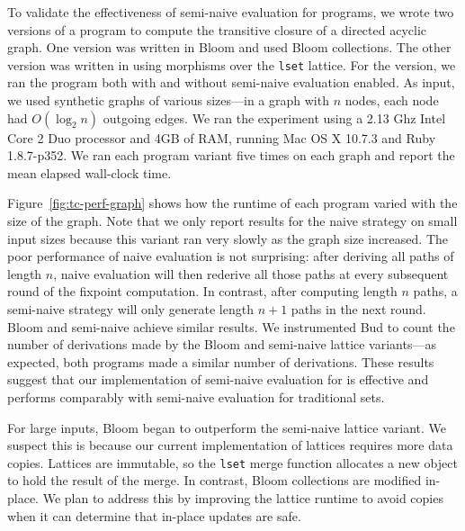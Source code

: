 To validate the effectiveness of semi-naive evaluation for \lang programs, we
wrote two versions of a program to compute the transitive closure of a directed
acyclic graph. One version was written in Bloom and used Bloom collections. The
other version was written in \lang using morphisms over the \texttt{lset}
lattice. For the \lang version, we ran the program both with and without
semi-naive evaluation enabled. As input, we used synthetic graphs of various
sizes---in a graph with $n$ nodes, each node had $O(\log_2 n)$ outgoing
edges. We ran the experiment using a 2.13 Ghz Intel Core 2 Duo processor and 4GB
of RAM, running Mac OS X 10.7.3 and Ruby 1.8.7-p352. We ran each program variant
five times on each graph and report the mean elapsed wall-clock time.

Figure~\ref{fig:tc-perf-graph} shows how the runtime of each program varied with
the size of the graph. Note that we only report results for the naive \lang
strategy on small input sizes because this variant ran very slowly as the graph
size increased. The poor performance of naive evaluation is not surprising:
after deriving all paths of length $n$, naive evaluation will then rederive all
those paths at every subsequent round of the fixpoint computation. In contrast,
after computing length $n$ paths, a semi-naive strategy will only generate
length $n+1$ paths in the next round. Bloom and semi-naive \lang achieve similar
results. We instrumented Bud to count the number of derivations made by the
Bloom and semi-naive lattice variants---as expected, both programs made a
similar number of derivations. These results suggest that our implementation of
semi-naive evaluation for \lang is effective and performs comparably with
semi-naive evaluation for traditional sets.

For large inputs, Bloom began to outperform the semi-naive lattice variant. We
suspect this is because our current implementation of lattices requires more
data copies. Lattices are immutable, so the \texttt{lset} merge function
allocates a new object to hold the result of the merge. In contrast, Bloom
collections are modified in-place. We plan to address this by improving the
lattice runtime to avoid copies when it can determine that in-place updates are
safe.

